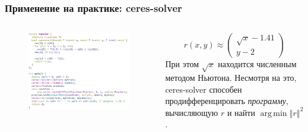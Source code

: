 \documentclass[notheorems,aspectratio=169]{beamer}
\DeclareMathOperator*{\argmin}{arg\,min}
\begin{document}
\begin{frame}
  \frametitle{Применение на практике: ceres-solver}

  \begin{columns}[c]
    \begin{column}{0.6\textwidth}
      \begin{figure}
        \includegraphics[width=0.8\linewidth, height=0.8\textheight, keepaspectratio]{minprog.png}\hspace*{4cm}
      \end{figure}
    \end{column}

    \begin{column}{0.4\textwidth}
      \begin{equation*}
        r\left(x, y\right)\approx
        \begin{pmatrix}
          \sqrt{x}-1.41 \\
          y-2
        \end{pmatrix}
      \end{equation*}
      При этом $\sqrt{x}$ находится численным методом Ньютона. Несмотря на это, ceres-solver способен продифференцировать \emph{программу}, вычисляющую $r$ и найти $\argmin\left\Vert r\right\Vert^2$.
    \end{column}
  \end{columns}

\end{frame}

  
\end{document}
